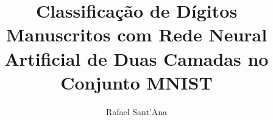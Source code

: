 \documentclass[letterpaper]{article} %
\title{Classificação de Dígitos Manuscritos com Rede Neural Artificial de Duas Camadas no Conjunto MNIST}
\author{
    Rafael Sant'Ana
}
\begin{document}
\maketitle

\begin{abstract}

\end{abstract}






\end{document}
